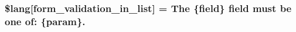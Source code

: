 \subsubsection[{\$lang}]{\setlength{\rightskip}{0pt plus 5cm}\$lang\mbox{[}\textquotesingle{}form\+\_\+validation\+\_\+in\+\_\+list\textquotesingle{}\mbox{]} = \textquotesingle{}The \{field\} field must be one of\+: \{param\}.\textquotesingle{}}\label{form__validation__lang_8php_ae48fb4c900d50c05f0939f9fec1262a2}

